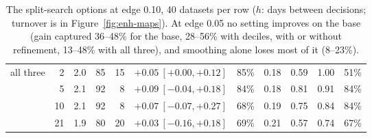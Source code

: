 \documentclass[11pt,a4paper]{article}
\newcommand{\1}{\mathbf{1}}
\begin{document}
\begin{table}[H]
\begin{tabular}{@{}l r r rr r r r rr r@{}}
\midrule
all three & 2 & 2.0 & 85 & 15 & $+0.05\ [+0.00,+0.12]$ & 85\% & 0.18 & 0.59 & 1.00 & 51\%\\
 & 5 & 2.1 & 92 & 8 & $+0.09\ [-0.04,+0.18]$ & 84\% & 0.18 & 0.81 & 0.91 & 84\%\\
 & 10 & 2.1 & 92 & 8 & $+0.07\ [-0.07,+0.27]$ & 68\% & 0.19 & 0.75 & 0.84 & 84\%\\
 & 21 & 1.9 & 80 & 20 & $+0.03\ [-0.16,+0.18]$ & 69\% & 0.21 & 0.57 & 0.74 & 67\%\\
\bottomrule
\end{tabular}
\caption{The split-search options at edge 0.10, 40 datasets per row ($h$: days between decisions; turnover is in Figure~\ref{fig:enh-maps}). At edge 0.05 no setting improves on the base (gain captured 36--48\% for the base, 28--56\% with deciles, with or without refinement, 13--48\% with all three), and smoothing alone loses most of it (8--23\%).}
\label{tab:enhancements}
\end{table}
\end{document}
